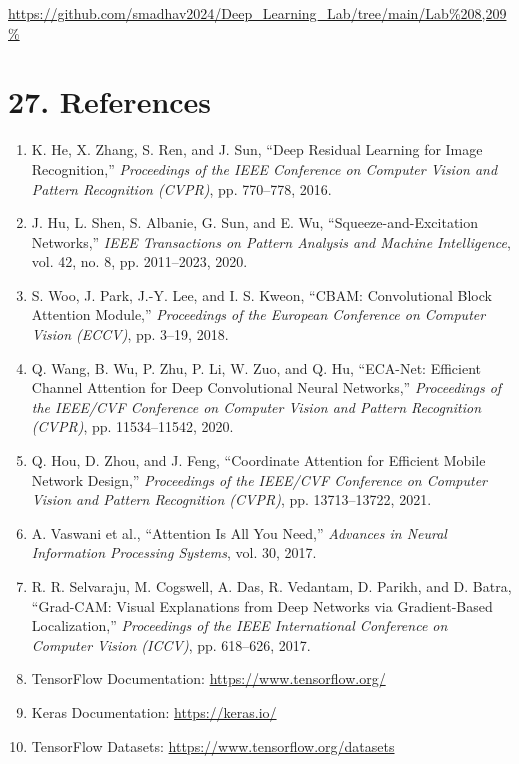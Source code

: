\documentclass[11pt]{article}
\begin{document}
\url{https://github.com/smadhav2024/Deep_Learning_Lab/tree/main/Lab%208,209%}

\section*{27. References}

\begin{enumerate}
\item K. He, X. Zhang, S. Ren, and J. Sun, ``Deep Residual Learning for
Image Recognition,'' \emph{Proceedings of the IEEE Conference on Computer
Vision and Pattern Recognition (CVPR)}, pp. 770--778, 2016.

\item J. Hu, L. Shen, S. Albanie, G. Sun, and E. Wu, ``Squeeze-and-Excitation
Networks,'' \emph{IEEE Transactions on Pattern Analysis and Machine
Intelligence}, vol. 42, no. 8, pp. 2011--2023, 2020.

\item S. Woo, J. Park, J.-Y. Lee, and I. S. Kweon, ``CBAM: Convolutional
Block Attention Module,'' \emph{Proceedings of the European Conference on
Computer Vision (ECCV)}, pp. 3--19, 2018.

\item Q. Wang, B. Wu, P. Zhu, P. Li, W. Zuo, and Q. Hu, ``ECA-Net: Efficient
Channel Attention for Deep Convolutional Neural Networks,'' \emph{Proceedings
of the IEEE/CVF Conference on Computer Vision and Pattern Recognition
(CVPR)}, pp. 11534--11542, 2020.

\item Q. Hou, D. Zhou, and J. Feng, ``Coordinate Attention for Efficient
Mobile Network Design,'' \emph{Proceedings of the IEEE/CVF Conference on
Computer Vision and Pattern Recognition (CVPR)}, pp. 13713--13722, 2021.

\item A. Vaswani et al., ``Attention Is All You Need,'' \emph{Advances in
Neural Information Processing Systems}, vol. 30, 2017.

\item R. R. Selvaraju, M. Cogswell, A. Das, R. Vedantam, D. Parikh, and
D. Batra, ``Grad-CAM: Visual Explanations from Deep Networks via
Gradient-Based Localization,'' \emph{Proceedings of the IEEE International
Conference on Computer Vision (ICCV)}, pp. 618--626, 2017.

\item TensorFlow Documentation: \url{https://www.tensorflow.org/}

\item Keras Documentation: \url{https://keras.io/}

\item TensorFlow Datasets: \url{https://www.tensorflow.org/datasets}
\end{enumerate}
\end{document}
